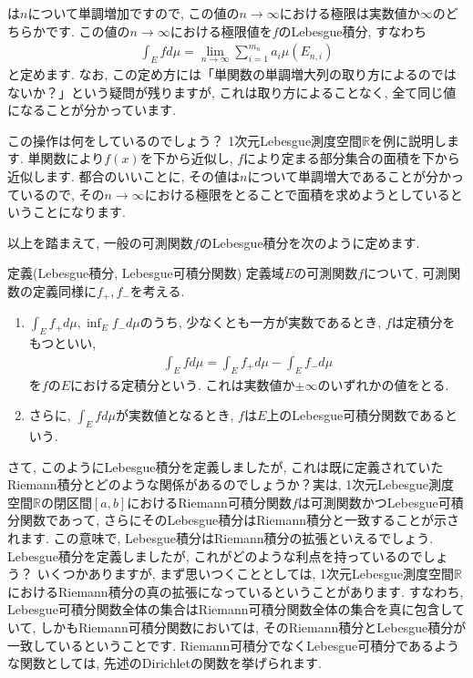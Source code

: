 は$n$について単調増加ですので, この値の$n \to \infty$における極限は実数値か$\infty$のどちらかです. この値の$n \to \infty$における極限値を$f$のLebesgue積分, すなわち
\begin{eqnarray}
\int_{E}fd\mu = \lim_{n \to \infty} \sum_{i=1}^{m_{n}}a_{i}\mu\left(E_{n,i}\right) \nonumber
\end{eqnarray}
と定めます. なお, この定め方には「単関数の単調増大列の取り方によるのではないか？」という疑問が残りますが, これは取り方によることなく, 全て同じ値になることが分かっています. 
\par この操作は何をしているのでしょう？ 1次元Lebesgue測度空間$\mathbb{R}$を例に説明します. 単関数により$f(x)$を下から近似し, $f$により定まる部分集合の面積を下から近似します. 都合のいいことに, その値は$n$について単調増大であることが分かっているので, その$n \to \infty$における極限をとることで面積を求めようとしているということになります. 
\par 以上を踏まえて, 一般の可測関数$f$のLebesgue積分を次のように定めます. 
\begin{itembox}[l]{定義(Lebesgue積分, Lebesgue可積分関数)}
定義域$E$の可測関数$f$について, 可測関数の定義同様に$f_{+}, f_{-}$を考える. 
\begin{enumerate}
\item $\int_{E}f_{+}d\mu, \inf_{E}f_{-}d\mu$のうち, 少なくとも一方が実数であるとき, $f$は定積分をもつといい,
\begin{eqnarray}
\int_{E}fd\mu=\int_{E}f_{+}d\mu - \int_{E}f_{-}d\mu \nonumber
\end{eqnarray}
を$f$の$E$における定積分という. これは実数値か$\pm \infty$のいずれかの値をとる. 
\item さらに, $\displaystyle \int_{E}fd\mu$が実数値となるとき, $f$は$E$上のLebesgue可積分関数であるという. 
\end{enumerate}
\end{itembox}
\par さて, このようにLebesgue積分を定義しましたが, これは既に定義されていたRiemann積分とどのような関係があるのでしょうか？実は, 1次元Lebesgue測度空間$\mathbb{R}$の閉区間$[a,b]$におけるRiemann可積分関数$f$は可測関数かつLebesgue可積分関数であって, さらにそのLebesgue積分はRiemann積分と一致することが示されます. この意味で, Lebesgue積分はRiemann積分の拡張といえるでしょう. 
Lebesgue積分を定義しましたが, これがどのような利点を持っているのでしょう？ いくつかありますが, まず思いつくこととしては, 1次元Lebesgue測度空間$\mathbb{R}$におけるRiemann積分の真の拡張になっているということがあります. すなわち, Lebesgue可積分関数全体の集合はRiemann可積分関数全体の集合を真に包含していて, しかもRiemann可積分関数においては, そのRiemann積分とLebesgue積分が一致しているということです. Riemann可積分でなくLebesgue可積分であるような関数としては, 先述のDirichletの関数を挙げられます. 
